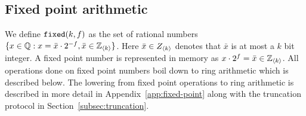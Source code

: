 \subsection{Fixed point arithmetic}
\label{subsec:fixed-point}


We define $\verb|fixed|(k, f)$ as the set of rational numbers $\{x \in \mathbb{Q} : x
= \bar{x} \cdot 2^{-f}, \bar{x} \in \mathbb{Z}_{\langle {k} \rangle}\}$. Here $\bar{x} \in
Z_{\langle {k} \rangle}$ denotes that $\bar{x}$ is at most a $k$ bit integer. A fixed
point number is represented in memory as $x \cdot 2^{f} = \bar{x} \in
\mathbb{Z}_{\langle {k} \rangle}$. All operations done on fixed point numbers boil down to ring
arithmetic which is described below. The lowering from fixed point operations
to ring arithmetic is described in more detail in Appendix~\ref{app:fixed-point}
along with the truncation protocol in Section~\ref{subsec:truncation}.


